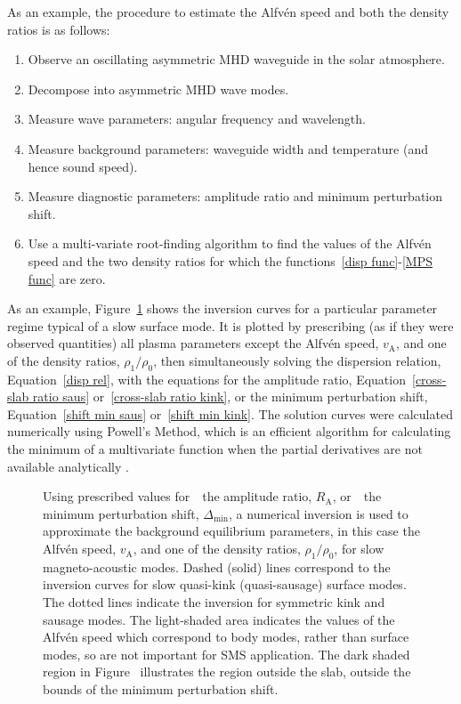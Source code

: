 \documentclass[12pt]{../style-files/ociamthesis}
\newcommand{\figdir}{../main/figures/chpt-4/} %
\begin{document}
As an example, the procedure to estimate the Alfv\'{e}n speed and both the density ratios is as follows:
\begin{enumerate}
	\item Observe an oscillating asymmetric MHD waveguide in the solar atmosphere.
	\item Decompose into asymmetric MHD wave modes.
	\item Measure wave parameters: angular frequency and wavelength.
	\item Measure background parameters: waveguide width and temperature (and hence sound speed).
	\item Measure diagnostic parameters: amplitude ratio and minimum perturbation shift.
	\item Use a multi-variate root-finding algorithm to find the values of the Alfv\'{e}n speed and the two density ratios for which the functions~\eqref{disp func}-\eqref{MPS func} are zero.
\end{enumerate}

As an example, Figure~\ref{fig: vA approx} shows the inversion curves for a particular parameter regime typical of a slow surface mode. It is plotted by prescribing (as if they were observed quantities) all plasma parameters except the Alfv\'{e}n speed, $v_\textrm{A}$, and one of the density ratios, $\rho_1/\rho_0$, then simultaneously solving the dispersion relation, Equation~\eqref{disp rel}, with the equations for the amplitude ratio, Equation~\eqref{cross-slab ratio saus} or~\eqref{cross-slab ratio kink}, or the minimum perturbation shift, Equation~\eqref{shift min saus} or~\eqref{shift min kink}. The solution curves were calculated numerically using Powell's Method, which is an efficient algorithm for calculating the minimum of a multivariate function when the partial derivatives are not available analytically \citep{pow64}.

\begin{figure}
	\centering
	\caption{Using prescribed values for~\protect{}~the amplitude ratio, $R_\textrm{A}$, or~\protect{}~the minimum perturbation shift, $\Delta_\textrm{min}$, a numerical inversion is used to approximate the background equilibrium parameters, in this case the Alfv\'{e}n speed, $v_\textrm{A}$, and one of the density ratios, $\rho_1 / \rho_0$, for slow magneto-acoustic modes. Dashed (solid) lines correspond to the inversion curves for slow quasi-kink (quasi-sausage) surface modes. The dotted lines indicate the inversion for symmetric kink and sausage modes. The light-shaded area indicates the values of the Alfv\'{e}n speed which correspond to body modes, rather than surface modes, so are not important for SMS application. The dark shaded region in Figure~\protect{} illustrates the region outside the slab, outside the bounds of the minimum perturbation shift.}
	\label{fig: vA approx}
\end{figure}
\end{document}
